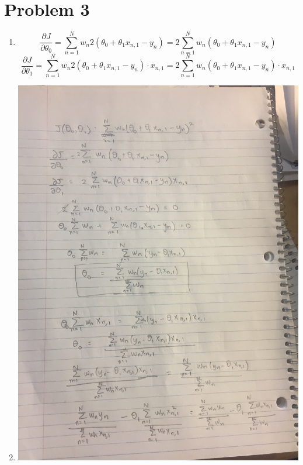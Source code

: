 \documentclass[11pt]{article}
\newcommand{\solution}[1]{{{\color{blue}{\bf Solution:} {#1}}}}
\begin{document}
\section{Problem 3}
\begin{enumerate}
\item
\solution{} 
$$
\frac{\partial J}{\partial \theta_0} = \sum_{n=1}^N w_n 2 (\theta_0 + \theta_1 x_{n,1} - y_n) = 2 \sum_{n=1}^N w_n (\theta_0 + \theta_1 x_{n,1} - y_n)
$$
$$
\frac{\partial J}{\partial \theta_1} = \sum_{n=1}^N w_n 2 (\theta_0 + \theta_1 x_{n,1} - y_n) \cdot x_{n,1} = 
2 \sum_{n=1}^N w_n (\theta_0 + \theta_1 x_{n,1} - y_n) \cdot x_{n,1}
$$

\item
\solution{} \newline
\includegraphics[scale=0.1]{3b_1.jpg} \newline

\end{enumerate}
\end{document}
